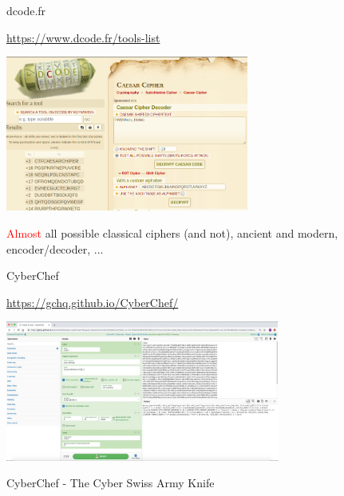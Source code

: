 \documentclass[handout, xcolor=dvipsnames,aspectratio=169]{beamer}
\begin{document}
\begin{frame}{dcode.fr}

  \centering

  \href{https://www.dcode.fr/tools-list}{https://www.dcode.fr/tools-list}

  \medskip

  \includegraphics[width=8cm]{img/dcode.png}

  \medskip

  \textcolor{red}{Almost} all possible classical ciphers (and not), ancient and modern, encoder/decoder, ...

\end{frame}
\begin{frame}{CyberChef}

  \centering

  \href{https://gchq.github.io/CyberChef/}{https://gchq.github.io/CyberChef/}

  \medskip

  \includegraphics[width=9cm]{img/cyberchef.jpg}

  \medskip

  CyberChef - The Cyber Swiss Army Knife

\end{frame}
\end{document}
